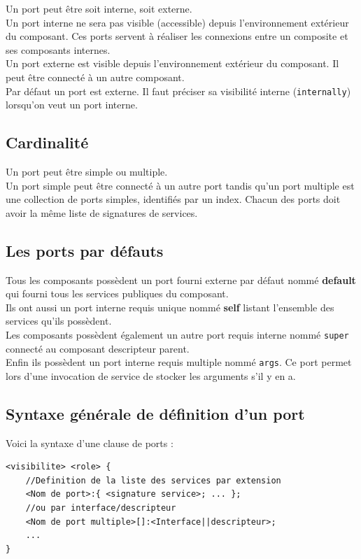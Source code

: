 \documentclass[11pt,a4paper,openany,oneside]{book}
\begin{document}
Un port peut être soit interne, soit externe.\\
Un port interne ne sera pas visible (accessible) depuis l'environnement extérieur du composant. Ces ports servent à réaliser les connexions entre un composite et ses composants internes.\\
Un port externe est visible depuis l'environnement extérieur du composant. Il peut être connecté à un autre composant.\\
Par défaut un port est externe. Il faut préciser sa visibilité interne (\texttt{internally}) lorsqu'on veut un port interne.

\subsection{Cardinalité}

Un port peut être simple ou multiple.\\
Un port simple peut être connecté à un autre port tandis qu'un port multiple est une collection de ports simples, identifiés par un index. Chacun des ports doit avoir la même liste de signatures de services.

\subsection{Les ports par défauts}

Tous les composants possèdent un port fourni externe par défaut nommé \textbf{default} qui fourni tous les services publiques du composant.\\
Ils ont aussi un port interne requis unique nommé \textbf{self} listant l'ensemble des services qu'ils possèdent.\\
Les composants possèdent également un autre port requis interne nommé \texttt{super} connecté au composant descripteur parent.\\
Enfin ils possèdent un port interne requis multiple nommé \texttt{args}. Ce port permet lors d'une invocation de service de stocker les arguments s'il y en a.

\subsection{Syntaxe générale de définition d'un port}

Voici la syntaxe d'une clause de ports : \\
\begin{lstlisting}[frame=single,caption=Syntaxe de la déclaration d'un port]
<visibilite> <role> {
    //Definition de la liste des services par extension
    <Nom de port>:{ <signature service>; ... };
    //ou par interface/descripteur
    <Nom de port multiple>[]:<Interface||descripteur>;
    ...
}
\end{lstlisting}
\end{document}
